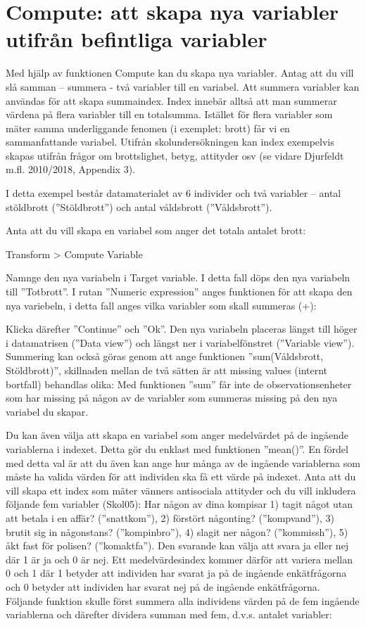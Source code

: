 \documentclass[
]{book}
\begin{document}
\hypertarget{compute-att-skapa-nya-variabler-utifruxe5n-befintliga-variabler}{%
\section{Compute: att skapa nya variabler utifrån befintliga variabler}\label{compute-att-skapa-nya-variabler-utifruxe5n-befintliga-variabler}}

Med hjälp av funktionen Compute kan du skapa nya variabler. Antag att du vill slå samman -- summera -
två variabler till en variabel. Att summera variabler kan användas för att skapa summaindex. Index
innebär alltså att man summerar värdena på flera variabler till en totalsumma. Istället för flera variabler
som mäter samma underliggande fenomen (i exemplet: brott) får vi en sammanfattande variabel.
Utifrån skolundersökningen kan index exempelvis skapas utifrån frågor om brottslighet, betyg, attityder
osv (se vidare Djurfeldt m.fl. 2010/2018, Appendix 3).

I detta exempel består datamaterialet av 6 individer och två variabler -- antal stöldbrott (''Stöldbrott'')
och antal våldsbrott (''Våldsbrott'').

Anta att du vill skapa en variabel som anger det totala antalet brott:

Transform \textgreater{} Compute Variable

Namnge den nya variabeln i Target variable. I detta fall döps den nya variabeln till ''Totbrott''. I rutan
''Numeric expression'' anges funktionen för att skapa den nya variebeln, i detta fall anges vilka variabler
som skall summeras (+):

Klicka därefter ''Continue'' och ''Ok''. Den nya variabeln placeras längst till höger i datamatrisen (''Data
view'') och längst ner i variabelfönstret (''Variable view'').
Summering kan också göras genom att ange funktionen ''sum(Våldsbrott, Stöldbrott)'', skillnaden
mellan de två sätten är att missing values (internt bortfall) behandlas olika: Med funktionen ''sum'' får
inte de observationsenheter som har missing på någon av de variabler som summeras missing på den
nya variabel du skapar.

Du kan även välja att skapa en variabel som anger medelvärdet på de ingående variablerna i indexet.
Detta gör du enklast med funktionen ''mean()''. En fördel med detta val är att du även kan ange hur
många av de ingående variablerna som måste ha valida värden för att individen ska få ett värde på
indexet. Anta att du vill skapa ett index som mäter vänners antisociala attityder och du vill inkludera
följande fem variabler (Skol05): Har någon av dina kompisar 1) tagit något utan att betala i en affär?
(''snattkom''), 2) förstört någonting? (''kompvand''), 3) brutit sig in någonstans? (''kompinbro''), 4) slagit
ner någon? (''kommissh''), 5) åkt fast för polisen? (''komaktfa''). Den svarande kan välja att svara ja eller
nej där 1 är ja och 0 är nej. Ett medelvärdesindex kommer därför att variera mellan 0 och 1 där 1
betyder att individen har svarat ja på de ingående enkätfrågorna och 0 betyder att individen har svarat
nej på de ingående enkätfrågorna. Följande funktion skulle först summera alla individens värden på de
fem ingående variablerna och därefter dividera summan med fem, d.v.s. antalet variabler:
\end{document}
